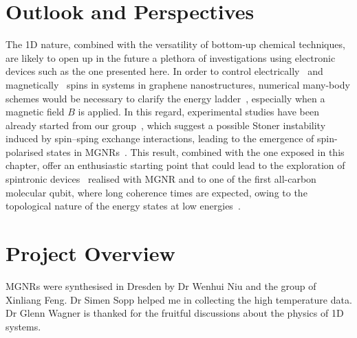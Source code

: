 \section{Outlook and Perspectives}
The 1D nature, combined with the versatility of bottom-up chemical techniques, are likely to open up in the future a plethora of investigations using electronic devices such as the one presented here. In order to control electrically~\cite{liu2021quantum} and magnetically~\cite{lombardi2019quantum} spins in systems in graphene nanostructures, numerical many-body schemes would be necessary to clarify the energy ladder~\cite{calvello2018ceres}, especially when a magnetic field $B$ is applied. In this regard, experimental studies have been already started from our group~\cite{sopp2021phd}, which suggest a possible Stoner instability induced by spin--sping exchange interactions, leading to the emergence of spin-polarised states in \glspl{MGNR}~\cite{kurland2000mesoscopic}. This result, combined with the one exposed in this chapter, offer an enthusiastic starting point that could lead to the exploration of spintronic devices~\cite{coronado2020molecular} realised with \gls{MGNR} and to one of the first all-carbon molecular qubit, where long coherence times are expected, owing to the topological nature of the energy states at low energies~\cite{groning2018engineering, rizzo2018topological}.

\section{Project Overview}

\Glspl{MGNR} were synthesised in Dresden by Dr Wenhui Niu and the group of Xinliang Feng. Dr Simen Sopp helped me in collecting the high temperature data. Dr Glenn Wagner is thanked for the fruitful discussions about the physics of 1D systems.